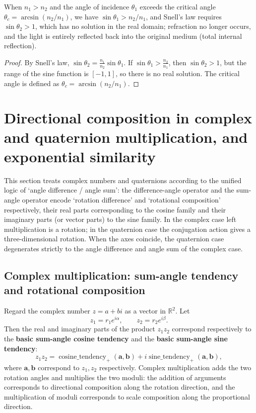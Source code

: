 \begin{proposition}\label{prop:critical_angle}
When $n_1 > n_2$ and the angle of incidence $\theta_1$ exceeds the critical angle $\theta_c = \arcsin(n_2/n_1)$, we have $\sin\theta_1 > n_2/n_1$, and Snell's law requires $\sin\theta_2 > 1$, which has no solution in the real domain; refraction no longer occurs, and the light is entirely reflected back into the original medium (total internal reflection).
\end{proposition}

\begin{proof}
By Snell's law, $\sin\theta_2 = \frac{n_1}{n_2}\sin\theta_1$. If $\sin\theta_1 > \frac{n_2}{n_1}$, then $\sin\theta_2 > 1$, but the range of the sine function is $[-1,1]$, so there is no real solution. The critical angle is defined as $\theta_c = \arcsin(n_2/n_1)$.
\end{proof}

\section{Directional composition in complex and quaternion multiplication, and exponential similarity}
\label{sec:complex_quaternion_exponential_similarity}

This section treats complex numbers and quaternions according to the unified logic of `angle difference / angle sum': the difference-angle operator and the sum-angle operator encode `rotation difference' and `rotational composition' respectively, their real parts corresponding to the cosine family and their imaginary parts (or vector parts) to the sine family. In the complex case left multiplication is a rotation; in the quaternion case the conjugation action gives a three-dimensional rotation. When the axes coincide, the quaternion case degenerates strictly to the angle difference and angle sum of the complex case.

\subsection{Complex multiplication: sum-angle tendency and rotational composition}

\begin{proposition}\label{prop:complex_multiplication}
Regard the complex number $z=a+bi$ as a vector in $\mathbb R^2$. Let
\[
z_1=r_1e^{i\alpha},\qquad z_2=r_2e^{i\beta}.
\]
Then the real and imaginary parts of the product $z_1z_2$ correspond respectively to the \textbf{basic sum-angle cosine tendency} and the \textbf{basic sum-angle sine tendency}:
\[
z_1z_2
=
\operatorname{cosine\_tendency}_+(\mathbf a,\mathbf b)
+
i\operatorname{sine\_tendency}_+(\mathbf a,\mathbf b),
\]
where $\mathbf a,\mathbf b$ correspond to $z_1,z_2$ respectively. Complex multiplication adds the two rotation angles and multiplies the two moduli: the addition of arguments corresponds to directional composition along the rotation direction, and the multiplication of moduli corresponds to scale composition along the proportional direction.
\end{proposition}

